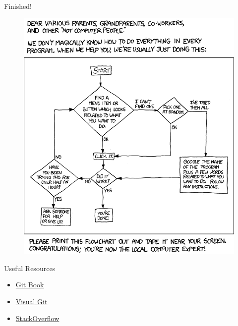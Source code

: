 \documentclass[11pt,professionalfonts]{beamer}
\begin{document}
\begin{frame}{Finished!}%
\begin{figure}
    \centering
    \includegraphics[height=0.8\textheight]{figures/tech_support_cheat_sheet.png}
\end{figure}
\end{frame}

\begin{frame}{Useful Resources}
\begin{itemize}
    \item \href{https://git-scm.com/}{Git Book}
    \item \href{http://marklodato.github.io/visual-git-guide/index-en.html}{Visual Git}
    \item \href{http://stackoverflow.com/questions/315911/git-for-beginners-the-definitive-practical-guide}{StackOverflow}
\end{itemize}
\end{frame}%
\end{document}
